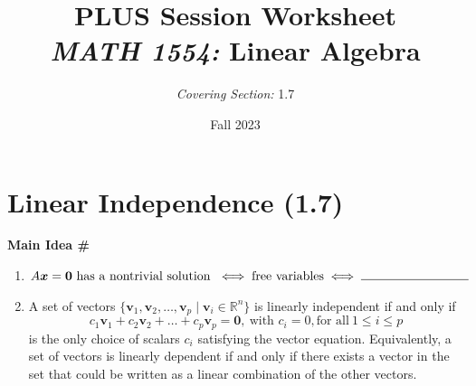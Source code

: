 \documentclass[10pt, titlepage]{article}
\title{\normalsize PLUS Session Worksheet \\[1em] \Large \textit{MATH 1554:} Linear Algebra}
\author{\textit{Covering Section:} 1.7}
\date{Fall 2023}
\newcounter{mainideas}
\newcommand{\mainidea}{\textbf{Main Idea \#\themainideas \stepcounter{mainideas}}}
\newenvironment{mideea}[1]
{%
\begin{lrbox}{\mybox}%
	\begin{minipage}{#1\textwidth}
		{\centering \mainidea \par}

}
{\end{minipage}\end{lrbox}\begin{center}\fbox{\usebox{\mybox}}\end{center}}
\renewcommand{\vec}[1]{\bm{#1}}
\begin{document}
\maketitle

\section*{\centering Linear Independence (1.7)}
\begin{mideea}{0.9}
	\begin{enumerate}
		\item \(A\vec{x} = \vec{0} \ \text{has a nontrivial solution} \ \iff \text{free variables} \iff \rule{3cm}{0.15mm}\) 

		\item A set of vectors \(\{\vec{v}_1, \vec{v}_2, \dots, \vec{v}_p \mid \vec{v}_i \in \mathbb{R}^n\}\) is linearly independent if and only if 
		\[c_1\vec{v}_1 + c_2\vec{v}_2 + \dots + c_p\vec{v}_p = \vec{0}, \ \text{with } c_i = 0, \text{for all} \ 1 \le i \le p\] is the only choice of scalars 
		\(c_i\) satisfying the vector equation. Equivalently, a set of vectors is linearly dependent if and only if there exists a vector in the set that could be 
		written as a linear combination of the other vectors.
	\end{enumerate}
\end{mideea}
\end{document}
